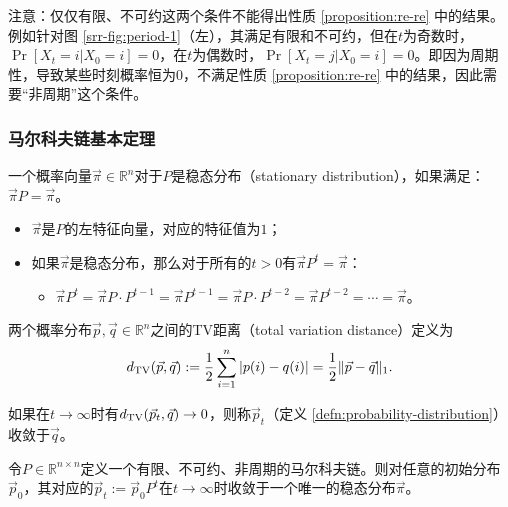\documentclass[lang=cn,newtx,10pt,scheme=chinese,chinesefont=nofont,citestyle=gb7714-2015, bibstyle=gb7714-2015]{elegantbook}
\begin{document}
\begin{refsection}
    注意：仅仅有限、不可约这两个条件不能得出性质 \ref{proposition:re-re} 中的结果。例如针对图 \ref{srr-fig:period-1}（左），其满足有限和不可约，但在$t$为奇数时，$\Pr[X_t=i|X_0=i]=0$，在$t$为偶数时，$\Pr[X_t=j|X_0=i]=0$。即因为周期性，导致某些时刻概率恒为$0$，不满足性质 \ref{proposition:re-re} 中的结果，因此需要“非周期”这个条件。



    \subsubsection{马尔科夫链基本定理}
        
    \begin{definition}[稳态分布]
        \label{defn:stationary-distribution}
        一个概率向量$\vec{\pi}\in\mathbb{R}^n$对于$P$是稳态分布（stationary distribution），如果满足：$\vec{\pi}P=\vec{\pi}$。
    \end{definition}

    \begin{itemize}
        \item $\vec{\pi}$是$P$的左特征向量，对应的特征值为$1$；
        \item 如果$\vec{\pi}$是稳态分布，那么对于所有的$t>0$有$\vec{\pi}P^t=\vec{\pi}$：
        \begin{itemize}
            \item $\vec{\pi}P^t=\vec{\pi}P\cdot P^{t-1}=\vec{\pi}P^{t-1}=\vec{\pi}P\cdot P^{t-2}=\vec{\pi}P^{t-2}=\cdots=\vec{\pi}$。
        \end{itemize}
    \end{itemize}

    \begin{definition}[TV距离]
        \label{defn:tv-distance}
        两个概率分布$\vec{p},\vec{q}\in\mathbb{R}^n$之间的TV距离（total variation distance）定义为
        \[
            d_{\textup{TV}}(\vec{p},\vec{q}):=\frac{1}{2}\sum_{i=1}^n{|p(i)-q(i)|}=\frac{1}{2}\lVert \vec{p}-\vec{q}\rVert_1.
        \]
    \end{definition}

    如果在$t\rightarrow \infty$时有$d_{\textup{TV}}(\vec{p}_t,\vec{q})\rightarrow 0$，则称$\vec{p}_t$（定义 \ref{defn:probability-distribution}）收敛于$\vec{q}$。

    \begin{theorem}[马尔科夫链基本定理] 
        \label{thrm:fund-mc}
        令$P\in \mathbb{R}^{n\times n}$定义一个有限、不可约、非周期的马尔科夫链。则对任意的初始分布$\vec{p}_0$，其对应的$\vec{p}_t:=\vec{p}_0P^t$在$t\rightarrow \infty$时收敛于一个唯一的稳态分布$\vec{\pi}$。
    \end{theorem}


\end{refsection}
\end{document}
